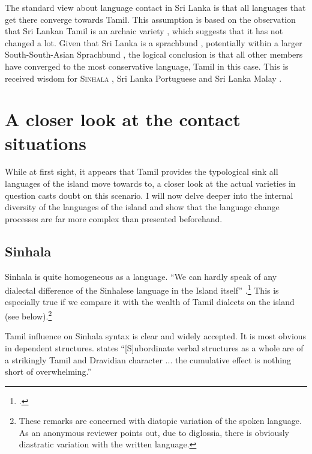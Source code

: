 \documentclass{article}
\begin{document}
The standard view about language contact in Sri Lanka is that all languages that get there converge towards Tamil. This assumption is based on the observation that Sri Lankan Tamil is an archaic variety \citep{Zvelebil1959II}, which suggests that it has not changed a lot. Given that Sri Lanka is a sprachbund \citep{Bakker2006}, potentially within a larger South-South-Asian Sprachbund \citep{Gair2012xc}, the logical conclusion is that all other members have converged to the most conservative language, Tamil in this case. This is received wisdom for \textsc{Sinhala} \citep{Geiger1973, Elizarenkova1972}, Sri Lanka Portuguese \citep{Smith1979} and Sri Lanka Malay \citep{Hussainmiya1990, SmithEtAl2006cll, Bakker2006}.  



\section{A closer look at the contact situations}
While at first sight, it appears that Tamil provides the typological sink all languages of the island move towards to, a closer look at the actual varieties in question casts doubt on this scenario. I will now delve deeper into the internal diversity of the languages of the island and show that  the language change processes are far more complex than presented beforehand. 



\subsection{Sinhala}

Sinhala is quite homogeneous as a language. ``We can hardly speak of any dialectal difference of the Sinhalese language in the Island itself'' \citep[168]{Geiger1938}.\footnote{\citep[also cf.][xii]{Jayawardena1996}.} This is especially true if we compare it with the wealth of Tamil dialects on the island (see below).\footnote{These remarks are concerned with diatopic variation of the spoken language. As an anonymous reviewer points out, due to diglossia, there is obviously diastratic variation with the written language.}

Tamil influence on Sinhala syntax is clear and widely accepted. It is most obvious in  dependent structures. \citet{Gair1998someremarks} states   ``[S]ubordinate verbal structures as a whole are of a strikingly Tamil and Dravidian character ...  the cumulative effect is nothing short of overwhelming.'' 
\end{document}
